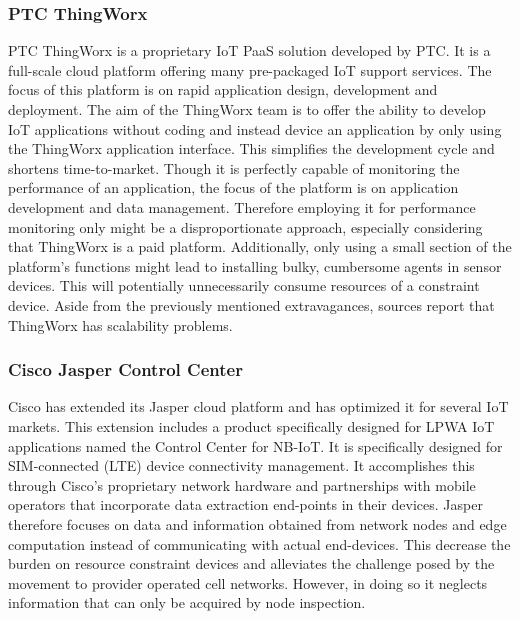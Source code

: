 \subsubsection*{PTC ThingWorx}
PTC ThingWorx\cite{web:thingworx} is a proprietary IoT PaaS solution developed by PTC. It is a full-scale cloud platform offering many pre-packaged IoT support services. The focus of this platform is on rapid application design, development and deployment. The aim of the ThingWorx team is to offer the ability to develop IoT applications without coding and instead device an application by only using the ThingWorx application interface. This simplifies the development cycle and shortens time-to-market\cite{study_of_various}. Though it is perfectly capable of monitoring the performance of an application, the focus of the platform is on application development and data management. Therefore employing it for performance monitoring only might be a disproportionate approach, especially considering that ThingWorx is a paid platform. Additionally, only using a small section of the platform's functions might lead to installing bulky, cumbersome agents in sensor devices. This will potentially unnecessarily consume resources of a constraint device. Aside from the previously mentioned extravagances, sources report that ThingWorx has scalability problems\cite{good_assessment}.%

\subsubsection*{Cisco Jasper Control Center}
Cisco has extended its Jasper cloud platform and has optimized it for several IoT markets. This extension includes a product specifically designed for LPWA IoT applications named the Control Center for NB-IoT\cite{cisco_jasper}. It is specifically designed for SIM-connected (LTE) device connectivity management\cite{forrester}. It accomplishes this through Cisco's proprietary network hardware and partnerships with mobile operators that incorporate data extraction end-points in their devices. Jasper therefore focuses on data and information obtained from network nodes and edge computation instead of communicating with actual end-devices. This decrease the burden on resource constraint devices and alleviates the challenge posed by the movement to provider operated cell networks. However, in doing so it neglects information that can only be acquired by node inspection. 


